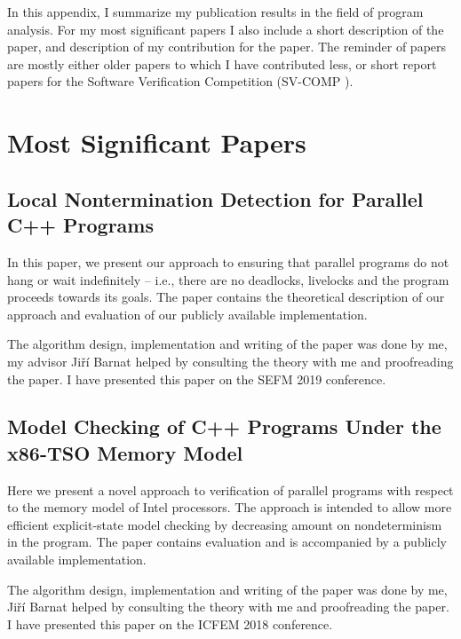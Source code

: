 In this appendix, I summarize my publication results in the field of program analysis.
For my most significant papers I also include a short description of the paper, and description of my contribution for the paper.
The reminder of papers are mostly either older papers to which I have contributed less, or short report papers for the Software Verification Competition (SV-COMP \cite{svc2020}).

\section{Most Significant Papers}

\subsection*{Local Nontermination Detection for Parallel C++ Programs}

In this paper, we present our approach to ensuring that parallel programs do not hang or wait indefinitely – i.e., there are no deadlocks, livelocks and the program proceeds towards its goals.
The paper contains the theoretical description of our approach and evaluation of our publicly available implementation.

The algorithm design, implementation and writing of the paper was done by me, my advisor Jiří Barnat helped by consulting the theory with me and proofreading the paper.
I have presented this paper on the SEFM 2019 conference.

\bigskip\noindent{}

\subsection*{Model Checking of C++ Programs Under the x86-TSO Memory Model}

Here we present a novel approach to verification of parallel programs with respect to the memory model of Intel processors.
The approach is intended to allow more efficient explicit-state model checking by decreasing amount on nondeterminism in the program.
The paper contains evaluation and is accompanied by a publicly available implementation.

The algorithm design, implementation and writing of the paper was done by me, Jiří Barnat helped by consulting the theory with me and proofreading the paper.
I have presented this paper on the ICFEM 2018 conference.

\bigskip\noindent{}

